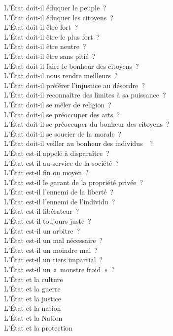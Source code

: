\documentclass[a4paper,12pt]{article}
\begin{document}
L'État doit-il éduquer le peuple ? \\
L'État doit-il éduquer les citoyens ? \\
L'État doit-il être fort ? \\
L'État doit-il être le plus fort ? \\
L'État doit-il être neutre ? \\
L'État doit-il être sans pitié ? \\
L'État doit-il faire le bonheur des citoyens ? \\
L'État doit-il nous rendre meilleurs ? \\
L'État doit-il préférer l'injustice au désordre ? \\
L'État doit-il reconnaître des limites à sa puissance ? \\
L'État doit-il se mêler de religion ? \\
L'État doit-il se préoccuper des arts ? \\
L'État doit-il se préoccuper du bonheur des citoyens ? \\
L'État doit-il se soucier de la morale ? \\
L'État doit-il veiller au bonheur des individus  ? \\
L'État est-il appelé à disparaître ? \\
L'État est-il au service de la société ? \\
L'État est-il fin ou moyen ? \\
L'État est-il le garant de la propriété privée ? \\
L'État est-il l'ennemi de la liberté ? \\
L'État est-il l'ennemi de l'individu ? \\
L'État est-il libérateur ? \\
L'État est-il toujours juste ? \\
L'État est-il un arbitre ? \\
L'État est-il un mal nécessaire ? \\
L'État est-il un moindre mal ? \\
L'État est-il un tiers impartial ? \\
L'État est-il un « monstre froid » ? \\
L'État et la culture \\
L'État et la guerre \\
L'État et la justice \\
L'État et la nation \\
L'État et la Nation \\
L'État et la protection \\
\end{document}

